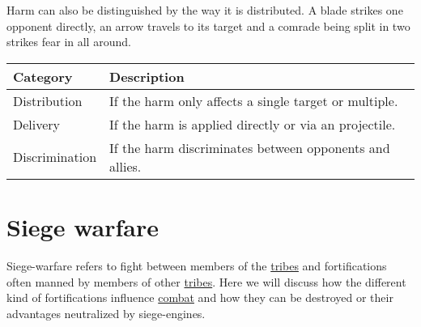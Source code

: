 Harm can also be distinguished by the way it is distributed. A blade strikes
one opponent directly, an arrow travels to its target and a comrade being split
in two strikes fear in all around.

\begin{longtable}{ll}
	\toprule
	Category       & Description                                             \\
	\midrule
	Distribution   & If the harm only affects a single target or multiple.   \\
	Delivery       & If the harm is applied directly or via an projectile.   \\
	Discrimination & If the harm discriminates between opponents and allies. \\
	\bottomrule
\end{longtable}

\section{Siege warfare}\label{ch:Conflict:Sieges}

Siege-warfare refers to fight between members of the
\hyperref[ch:Tribes]{tribes} and fortifications often manned by members of
other \hyperref[ch:Tribes]{tribes}. Here we will discuss how the different kind
of fortifications influence \hyperref[ch:Conflict:Combat]{combat} and how they
can be destroyed or their advantages neutralized by siege-engines.
